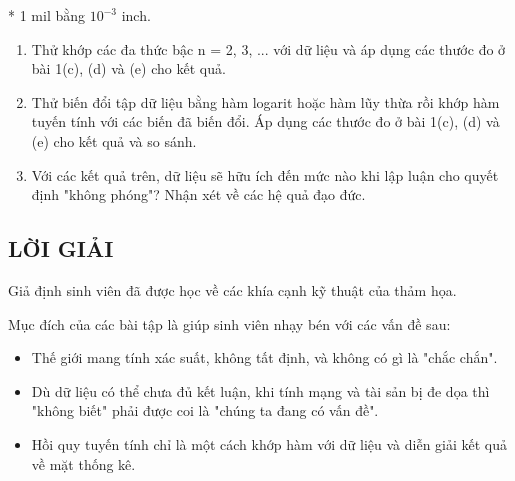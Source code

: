 * 1 mil bằng \(10^{-3}\) inch.

\begin{enumerate}
\def\labelenumi{\arabic{enumi}.}
\setcounter{enumi}{1}
\item
  Thử khớp các đa thức bậc n = 2, 3, ... với dữ liệu và áp dụng các thước đo ở bài 1(c), (d) và (e) cho kết quả.
\item
  Thử biến đổi tập dữ liệu bằng hàm logarit hoặc hàm lũy thừa rồi khớp hàm tuyến tính với các biến đã biến đổi. Áp dụng các thước đo ở bài 1(c), (d) và (e) cho kết quả và so sánh.
\item
  Với các kết quả trên, dữ liệu sẽ hữu ích đến mức nào khi lập luận cho quyết định "không phóng"? Nhận xét về các hệ quả đạo đức.
\end{enumerate}

\subsection{LỜI GIẢI}

Giả định sinh viên đã được học về các khía cạnh kỹ thuật của thảm họa.

Mục đích của các bài tập là giúp sinh viên nhạy bén với các vấn đề sau:

\begin{itemize}
\item
  Thế giới mang tính xác suất, không tất định, và không có gì là "chắc chắn".
\item
  Dù dữ liệu có thể chưa đủ kết luận, khi tính mạng và tài sản bị đe dọa thì "không biết" phải được coi là "chúng ta đang có vấn đề".
\item
  Hồi quy tuyến tính chỉ là một cách khớp hàm với dữ liệu và diễn giải kết quả về mặt thống kê.
\end{itemize}

